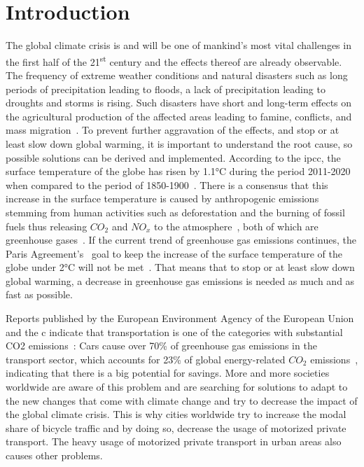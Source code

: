 \cleardoublepage
\chapter{Introduction}
\label{cha:introduction}
The global climate crisis is and will be one of mankind's most vital challenges in the first half of the 21\textsuperscript{st} century and the effects thereof are already observable.
The frequency of extreme weather conditions and natural disasters such as long periods of precipitation leading to floods, a lack of precipitation leading to droughts and storms is rising.
Such disasters have short and long-term effects on the agricultural production of the affected areas leading to famine, conflicts, and mass migration~\cite{kaczan2020impact}.
To prevent further aggravation of the effects, and stop or at least slow down global warming, it is important to understand the root cause, so possible solutions can be derived and implemented. 
According to the \ac{ipcc}, the surface temperature of the globe has risen by 1.1°C during the period 2011-2020 when compared to the period of 1850-1900~\cite{lee2023climate}.
There is a consensus that this increase in the surface temperature is caused by anthropogenic emissions stemming from human activities such as deforestation and the burning of fossil fuels thus releasing $CO_{2}$ and $NO_{x}$ to the atmosphere~\cite{archer2010climate}, both of which are greenhouse gases~\cite{grewe2019contribution}.
If the current trend of greenhouse gas emissions continues, the Paris Agreement's~\cite{un2015paris} goal to keep the increase of the surface temperature of the globe under 2°C will not be met~\cite{noah2023data}.
That means that to stop or at least slow down global warming, a decrease in greenhouse gas emissions is needed as much and as fast as possible.

Reports published by the European Environment Agency of the European Union and the \ac{c} indicate that transportation is one of the categories with substantial CO2 emissions~\cite{lee2023climate2}:
Cars cause over 70\% of greenhouse gas emissions in the transport sector, which accounts for 23\% of global energy-related $CO_{2}$ emissions~\cite{jaramillo2022transport}, indicating that there is a big potential for savings.
More and more societies worldwide are aware of this problem and are searching for solutions to adapt to the new changes that come with climate change and try to decrease the impact of the global climate crisis.
This is why cities worldwide try to increase the modal share of bicycle traffic and by doing so, decrease the usage of motorized private transport.
The heavy usage of motorized private transport in urban areas also causes other problems.

